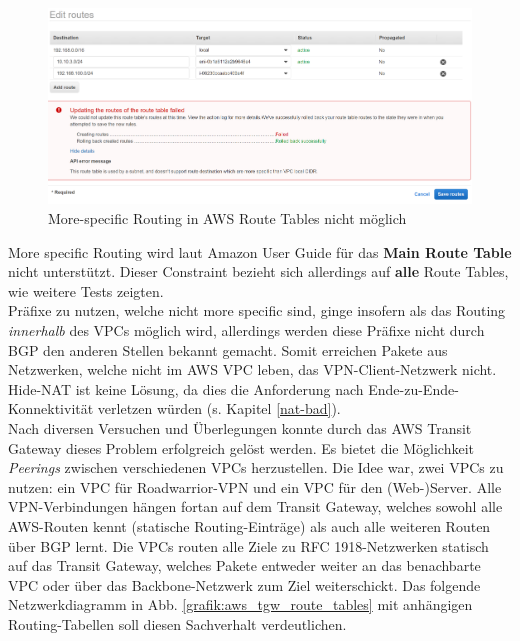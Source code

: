 \begin{figure}[h]
  \centering
  \includegraphics[scale=0.35]{Figures/more_specific_not_allowed_aws.PNG}
  \caption{More-specific Routing in AWS Route Tables nicht möglich}
  \label{grafik:more_specific_not_allowed_aws}
\end{figure}\FloatBarrier
More specific Routing wird laut Amazon User Guide für das \textbf{Main Route Table} nicht unterstützt\cite[S.230]{awsug2020}. Dieser Constraint bezieht sich allerdings auf \textbf{alle} Route Tables, wie weitere Tests zeigten.\\
Präfixe zu nutzen, welche nicht more specific sind, ginge insofern als das Routing \textit{innerhalb} des \gls{VPC}s möglich wird, allerdings werden diese Präfixe nicht durch \gls{BGP} den anderen Stellen bekannt gemacht. Somit erreichen Pakete aus Netzwerken, welche nicht im AWS \gls{VPC} \glqq leben\grqq{}, das VPN-\gls{Client}-Netzwerk nicht.\\
Hide-NAT ist keine Lösung, da dies die Anforderung nach Ende-zu-Ende-Konnektivität verletzen würden (s. Kapitel \ref{nat-bad}).\\
Nach diversen Versuchen und Überlegungen konnte durch das AWS Transit Gateway dieses Problem erfolgreich gelöst werden. Es bietet die Möglichkeit \textit{Peerings} zwischen verschiedenen \gls{VPC}s herzustellen. Die Idee war, zwei \gls{VPC}s zu nutzen: ein \gls{VPC} für \gls{Roadwarrior}-\gls{VPN} und ein \gls{VPC} für den (Web-)Server. Alle \gls{VPN}-Verbindungen hängen fortan auf dem Transit Gateway, welches sowohl alle AWS-Routen kennt (statische Routing-Einträge) als auch alle weiteren Routen über \gls{BGP} lernt. Die \gls{VPC}s routen alle Ziele zu \gls{RFC} 1918-Netzwerken statisch auf das Transit Gateway, welches Pakete entweder weiter an das benachbarte \gls{VPC} oder über das Backbone-Netzwerk zum Ziel weiterschickt. Das folgende Netzwerkdiagramm in Abb. \ref{grafik:aws_tgw_route_tables} mit anhängigen Routing-Tabellen soll diesen Sachverhalt verdeutlichen.
